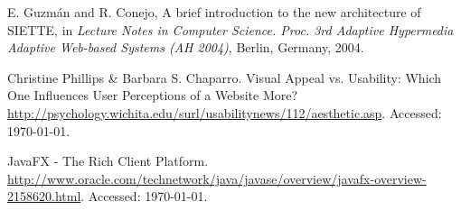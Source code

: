 \begin{thebibliography}{9}
 E. Guzmán and R. Conejo, A brief introduction to the new architecture of SIETTE, in \textit{Lecture Notes in Computer Science. Proc. 3rd Adaptive Hypermedia Adaptive Web-based Systems (AH 2004)}, Berlin, Germany,
2004.

 Christine Phillips \& Barbara S. Chaparro. Visual Appeal vs. Usability: Which One Influences User Perceptions of a Website More? \url{http://psychology.wichita.edu/surl/usabilitynews/112/aesthetic.asp}. Accessed: \today.

 JavaFX - The Rich Client Platform. \url{http://www.oracle.com/technetwork/java/javase/overview/javafx-overview-2158620.html}. Accessed: \today.

\end{thebibliography}